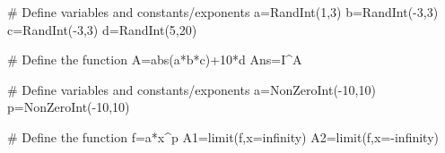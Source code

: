 
\begin{sagesilent}
# Define variables and constants/exponents
a=RandInt(1,3)
b=RandInt(-3,3)
c=RandInt(-3,3)
d=RandInt(5,20)

# Define the function
A=abs(a*b*c)+10*d
Ans=I^A
\end{sagesilent}
 

\begin{sagesilent}
# Define variables and constants/exponents
a=NonZeroInt(-10,10)
p=NonZeroInt(-10,10)

# Define the function
f=a*x^p
A1=limit(f,x=infinity)
A2=limit(f,x=-infinity)
\end{sagesilent}
 
